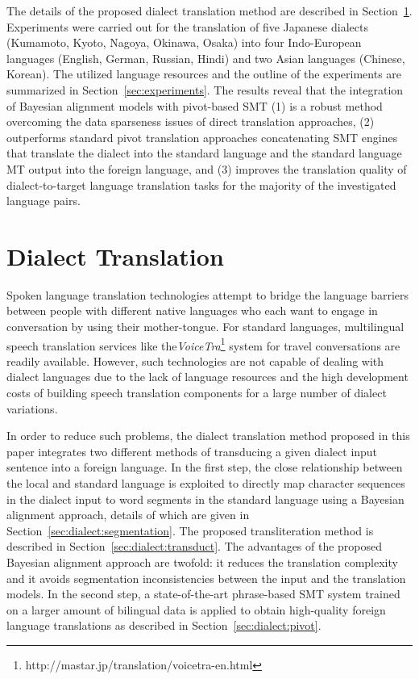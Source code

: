 \documentclass[english]{jnlp_1.4}
\begin{document}
 The details of the proposed dialect translation method are described in Section~\ref{sec:dialect}.
 Experiments were carried out for the translation of five Japanese dialects (Kumamoto, Kyoto, Nagoya, Okinawa, Osaka)
 into four Indo-European languages (English, German, Russian, Hindi) and two Asian languages (Chinese, Korean).
 The utilized language resources and the outline of the experiments are summarized in Section~\ref{sec:experiments}.
 The results reveal that the integration of Bayesian alignment models with pivot-based SMT
 (1) is a robust method overcoming the data sparseness issues of direct translation approaches,
 (2) outperforms standard pivot translation approaches concatenating SMT engines that translate the dialect
     into the standard language and the stand\-ard language MT output into the foreign language, and 
 (3) improves the translation quality of dialect-to-target language translation tasks for the majority of
     the investigated language pairs.
 


\section{Dialect Translation}
\label{sec:dialect}

 Spoken language translation technologies attempt to bridge the language barriers between
\linebreak
 people with different native languages who each want to engage in conversation by using
 their mother-tongue.
 For standard languages, multilingual speech translation services
 like the\linebreak \textit{VoiceTra}\footnote{http://mastar.jp/translation/voicetra-en.html} system for travel conversations
 are readily available.
 However, such technologies are not capable of dealing with dialect languages due to
 the lack of language resources and the high development costs of building
 speech translation components for a large number of dialect variations.

 In order to reduce such problems, the dialect translation method proposed in this paper integrates
 two different methods of transducing a given dialect input sentence into a foreign language.
 In the first step, the close relationship between the local and standard language is exploited
 to directly map character sequences in the dialect input to word segments
 in the standard language using a Bayesian alignment approach, details of which are given in Section~\ref{sec:dialect:segmentation}.
 The proposed transliteration method is described in Section~\ref{sec:dialect:transduct}.
 The advantages of the proposed Bayesian alignment approach are twofold: it reduces the translation complexity
 and it avoids segmentation inconsistencies between the input and the translation models.
 In the second step, a state-of-the-art phrase-based SMT system trained on a larger amount of bilingual data
 is applied to obtain high-quality foreign language translations as described in Section~\ref{sec:dialect:pivot}.
\end{document}
